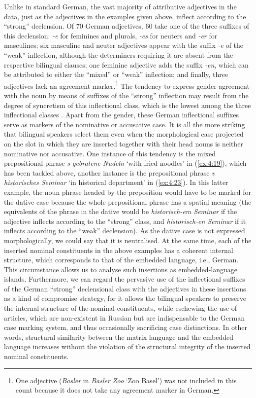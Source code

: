 Unlike in standard German, the vast majority of attributive adjectives in the data, just as the adjectives in the examples given above, inflect according to the ``strong'' declension. Of 70 German adjectives, 60 take one of the three suffixes of this declension: \textit{-e} for feminines and plurals, \textit{-es} for neuters and \textit{-er} for masculines; six masculine and neuter adjectives appear with the suffix \textit{-e} of the ``weak'' inflection, although the determiners requiring it are absent from the respective bilingual clauses;  one feminine adjective adds the suffix \textit {-en}, which can be attributed to either the ``mixed'' or ``weak'' inflection; and finally, three adjectives lack an agreement marker.\footnote{One adjective (\textit{Basler} in \textit{Basler Zoo} `Zoo Basel') was not included in this count because it does not take any agreement marker in German.} The tendency to express gender agreement with the noun by means of suffixes of the “strong” inflection may result from the degree of syncretism of this inflectional class, which is the lowest among the three inflectional classes \citep[][]{wurzel-84}. Apart from the gender, these German inflectional suffixes serve as markers of the nominative or accusative case. It is all the more striking that bilingual speakers select them even when the morphological case projected on the slot in which they are inserted together with their head nouns is neither nominative nor accusative. One instance of this tendency is the mixed prepositional phrase \textit{s gebratene Nudeln} `with fried noodles' in (\ref{ex:4:19}), which has been tackled above, another instance is the prepositional phrase \textit{v historisches Seminar} `in historical department' in (\ref{ex:4:23}). In this latter example, the noun phrase headed by the preposition would have to be marked for the dative case because the whole prepositional phrase has a spatial meaning (the equivalents of the phrase in the dative would be \textit{historisch-em Seminar} if the adjective inflects according to the “strong” class, and  \textit{historisch-en Seminar} if it inflects according to the “weak” declension). As the dative case is not expressed morphologically, we could say that it is neutralised. At the same time, each of the inserted nominal constituents in the above examples has a coherent internal structure, which corresponds to that of the embedded language, i.e., German. This circumstance allows us to analyse such insertions as embedded-language islands. Furthermore, we can regard the pervasive use of the inflectional suffixes of the German “strong” declensional class with the adjectives in these insertions as a kind of compromise strategy, for it allows the bilingual speakers to preserve the internal structure of the nominal constituents, while eschewing the use of articles, which are non-existent in Russian but are indispensable to the German case marking system, and thus occasionally sacrificing case distinctions. In other words, structural similarity between the matrix language and the embedded language increases without the violation of the structural integrity of the inserted nominal constituents.

